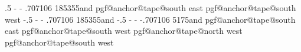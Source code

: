 {{{                \pgf@xc\halfwidth%
                \advance\pgf@x.5\pgf@xc%
                \advance\pgf@y-\halfheight%
                \advance\pgf@y-\halfbendheight%
                \pgf@yc\bendyradius%
                \advance\pgf@y.707106\pgf@yc%
              }%
              {185}{355}{\outerbendxradius and \outerbendyradius}%
              \else%
                \pgfpointintersectionoflines{\externalpoint}{\centerpoint}%
                  {\csname pgf@anchor@tape@south east\endcsname}%
                  {\csname pgf@anchor@tape@south west\endcsname}%
              \fi%
            \fi%
          \fi%
        \else%
          \ifx\bottombendstyle\pgf@lib@sh@inandouttext%
            \pgfmathpointintersectionoflineandarc{\externalpoint}{\centerpoint}%
              {%
                \centerpoint%
                \pgf@xc\halfwidth%
                \advance\pgf@x-.5\pgf@xc%
                \advance\pgf@y-\halfheight%
                \advance\pgf@y-\halfbendheight%
                \pgf@yc\bendyradius%
                \advance\pgf@y.707106\pgf@yc%
              }%
              {185}{355}{\outerbendxradius and \outerbendyradius}%
          \else%
            \ifx\bottombendstyle\pgf@lib@sh@outandintext%
              \pgfmathpointintersectionoflineandarc{\centerpoint}{\externalpoint}%
              {%
                \centerpoint%
                \pgf@xc\halfwidth%
                \advance\pgf@x-.5\pgf@xc%
                \advance\pgf@y-\halfheight%
                \advance\pgf@y-\halfbendheight%
                \pgf@yc\bendyradius%
                \advance\pgf@y-.707106\pgf@yc%
              }%
              {5}{175}{\innerbendxradius and \innerbendyradius}%
            \else%
              \pgfpointintersectionoflines{\externalpoint}{\centerpoint}%
                {\csname pgf@anchor@tape@south east\endcsname}%
                {\csname pgf@anchor@tape@south west\endcsname}%
            \fi%
          \fi%
        \fi%
      \else%
        \pgfpointintersectionoflines{\externalpoint}{\centerpoint}%
          {\csname pgf@anchor@tape@north west\endcsname}%
          {\csname pgf@anchor@tape@south west\endcsname}%
      \fi%
    \fi%
  }%
}%





%

